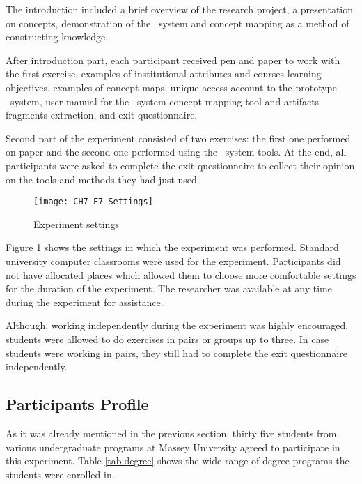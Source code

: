 The introduction included a brief overview of the research project, a
presentation on \LLLs concepts, demonstration of the \ep~system and concept
mapping as a method of constructing knowledge.

After introduction part, each participant received pen and paper to work with
the first exercise, examples of institutional attributes and courses learning
objectives, examples of concept maps, unique access account to the prototype
\ep~system, user manual for the \ep~system concept mapping tool and artifacts
fragments extraction, and exit questionnaire.

Second part of the experiment consisted of two exercises: the first one
performed on paper and the second one performed using the \ep~system tools. At
the end, all participants were asked to complete the exit questionnaire to
collect their opinion on the tools and methods they had just used.

\begin{figure}[htb]
\centering
\texttt{[image: CH7-F7-Settings]}
\caption{Experiment settings}
\label{fig:settings}
\end{figure}

Figure \ref{fig:settings} shows the settings in which the experiment was
performed. Standard university computer classrooms were used for the experiment.
Participants did not have allocated places which allowed them to choose more
comfortable settings for the duration of the experiment. The researcher was
available at any time during the experiment for assistance.

Although, working independently during the experiment was highly encouraged,
students were allowed to do exercises in pairs or groups up to three. In case
students were working in pairs, they still had to complete the exit
questionnaire independently.

\FloatBarrier

\subsection{Participants Profile}

As it was already mentioned in the previous section, thirty five students from
various undergraduate programs at Massey University agreed to participate in
this experiment. Table \ref{tab:degree} shows the wide range of degree programs
the students were enrolled in.


